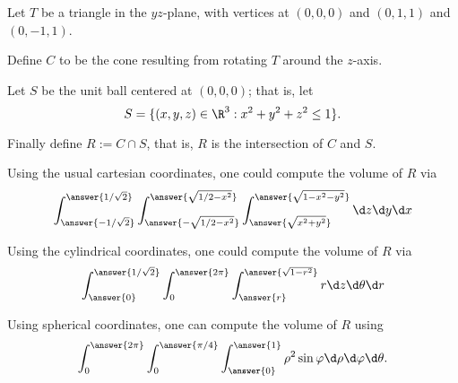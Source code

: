 \documentclass{ximera}
\author{Jim Fowler}
\begin{document}
  Let $T$ be a triangle in the $yz$-plane, with vertices at $(0,0,0)$ and $(0,1,1)$ and $(0,-1,1)$.

  Define $C$ to  be the cone resulting from rotating $T$ around the $z$-axis.

  Let $S$ be the unit ball centered at $(0,0,0)$; that is, let
  \[
    S = \{ (x,y,z) \in \R^3 : x^2 + y^2 + z^2 \leq 1 \}.
  \]
  
  Finally define $R := C \cap S$, that is, $R$ is the intersection of $C$ and $S$.
  
  \begin{exercise}
    Using the usual cartesian coordinates, one could compute the volume of $R$ via
    \[
      \int_{\answer{-1/\sqrt{2}}}^{\answer{1/\sqrt{2}}} \int_{\answer{-\sqrt{1/2-x^2}}}^{\answer{\sqrt{1/2-x^2}}} \int_{\answer{\sqrt{x^2+y^2}}}^{\answer{\sqrt{1-x^2-y^2}}} \d z \d y \d x
    \]
  \end{exercise}

  \begin{exercise}
    Using the cylindrical coordinates, one could compute the volume of $R$ via
    \[
      \int_{\answer{0}}^{\answer{1/\sqrt{2}}} \int_{0}^{\answer{2\pi}} \int_{\answer{r}}^{\answer{\sqrt{1-r^2}}} r \d z \d \theta \d r
    \]
  \end{exercise}

  
\begin{exercise}
  Using spherical coordinates, one can compute the volume of $R$ using
  \[
    \int_{0}^{\answer{2\pi}} \int_{0}^{\answer{\pi/4}} \int_{\answer{0}}^{\answer{1}} \rho^2 \sin \varphi \d \rho \d \varphi \d\theta.
  \]

\end{exercise}
\end{document}
